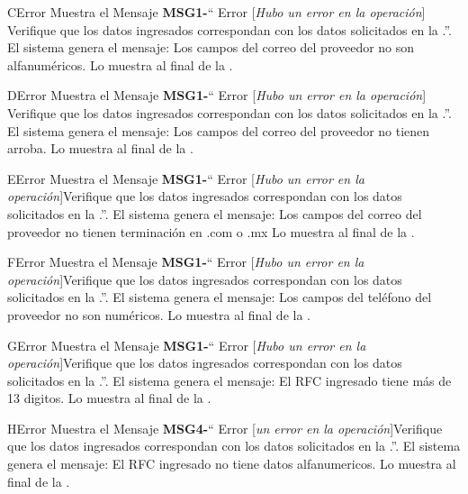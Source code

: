 \begin{UCtrayectoriaA}{C}{Error}
			\UCpaso Muestra el Mensaje {\bf MSG1-}`` Error [{\em Hubo un error en la operación}] Verifique que los datos ingresados correspondan con los datos solicitados en la  .''.
			\UCpaso El sistema genera el mensaje: Los campos del correo del proveedor no son alfanuméricos.
			\UCpaso Lo muestra al final de la  .
		\end{UCtrayectoriaA}

\begin{UCtrayectoriaA}{D}{Error}
			\UCpaso Muestra el Mensaje {\bf MSG1-}`` Error [{\em Hubo un error en la operación}] Verifique que los datos ingresados correspondan con los datos solicitados en la  .''.
			\UCpaso El sistema genera el mensaje: Los campos del correo del proveedor no tienen arroba.
			\UCpaso Lo muestra al final de la  .
		\end{UCtrayectoriaA}

\begin{UCtrayectoriaA}{E}{Error}
			\UCpaso Muestra el Mensaje {\bf MSG1-}`` Error [{\em Hubo un error en la operación}]Verifique que los datos ingresados correspondan con los datos solicitados en la  .''.
			\UCpaso El sistema genera el mensaje:  Los campos del correo del proveedor no tienen terminación en .com o .mx
			\UCpaso Lo muestra al final de la  .
		\end{UCtrayectoriaA}

\begin{UCtrayectoriaA}{F}{Error}
			\UCpaso Muestra el Mensaje {\bf MSG1-}`` Error [{\em Hubo un error en la operación}]Verifique que los datos ingresados correspondan con los datos solicitados en la  .''.
			\UCpaso El sistema genera el mensaje: Los campos del teléfono del proveedor no son numéricos.
			\UCpaso Lo muestra al final de la  .
		\end{UCtrayectoriaA}

\begin{UCtrayectoriaA}{G}{Error}
			\UCpaso Muestra el Mensaje {\bf MSG1-}`` Error [{\em Hubo un error en la operación}]Verifique que los datos ingresados correspondan con los datos solicitados en la  .''.
			\UCpaso El sistema genera el mensaje: El RFC ingresado tiene más de 13 digitos.
			\UCpaso Lo muestra al final de la  .
		\end{UCtrayectoriaA}

\begin{UCtrayectoriaA}{H}{Error}
			\UCpaso Muestra el Mensaje {\bf MSG4-}`` Error [{\em  un error en la operación}]Verifique que los datos ingresados correspondan con los datos solicitados en la  .''.
			\UCpaso El sistema genera el mensaje: El RFC ingresado no tiene datos alfanumericos.
			\UCpaso Lo muestra al final de la  .
		\end{UCtrayectoriaA}
